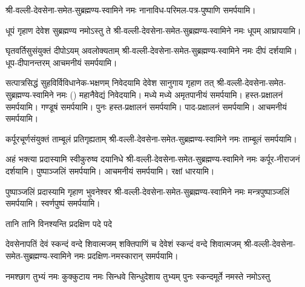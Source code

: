 \begin{center}
\begingroup
\setlength{\columnseprule}{1pt}
\let\chapt\sect



\endgroup

श्री-वल्ली-देवसेना-समेत-सुब्रह्मण्य-स्वामिने नमः नानाविध-परिमल-पत्र-पुष्पाणि समर्पयामि।


{धूपं गृहाण देवेश सुब्रह्मण्य नमोऽस्तु ते}
श्री-वल्ली-देवसेना-समेत-सुब्रह्मण्य-स्वामिने नमः धूपम् आघ्रापयामि।

{घृतवर्तिसुसंयुक्तं दीपोऽयम् अवलोक्यताम्}
श्री-वल्ली-देवसेना-समेत-सुब्रह्मण्य-स्वामिने नमः दीपं दर्शयामि। धूप-दीपानन्तरम् आचमनीयं समर्पयामि।

\twolineshloka
{सत्पात्रसिद्धं सुहविर्विविधानेक-भक्षणम्}
{निवेदयामि देवेश सानुगाय गृहाण तत्}
श्री-वल्ली-देवसेना-समेत-सुब्रह्मण्य-स्वामिने नमः () महानैवेद्यं निवेदयामि। 
मध्ये मध्ये अमृतपानीयं समर्पयामि। हस्त-प्रक्षालनं समर्पयामि। गण्डूषं समर्पयामि। पुनः हस्त-प्रक्षालनं समर्पयामि।
 पाद-प्रक्षालनं समर्पयामि। आचमनीयं समर्पयामि।

{कर्पूरचूर्णसंयुक्तं ताम्बूलं प्रतिगृह्यताम्}
श्री-वल्ली-देवसेना-समेत-सुब्रह्मण्य-स्वामिने नमः ताम्बूलं समर्पयामि।

{अहं भक्त्या प्रदास्यामि स्वीकुरुष्व दयानिधे}
श्री-वल्ली-देवसेना-समेत-सुब्रह्मण्य-स्वामिने नमः कर्पूर-नीराजनं दर्शयामि। 
पुष्पाञ्जलिं समर्पयामि। आचमनीयं समर्पयामि। रक्षां धारयामि।

{पुष्पाञ्जलिं प्रदास्यामि गृहाण भुवनेश्वर}
श्री-वल्ली-देवसेना-समेत-सुब्रह्मण्य-स्वामिने नमः मन्त्रपुष्पाञ्जलिं समर्पयामि। स्वर्णपुष्पं समर्पयामि।

{तानि तानि विनश्यन्ति प्रदक्षिण पदे पदे}

{देवसेनापतिं देवं स्कन्दं वन्दे शिवात्मजम्}
{शक्तिपाणिं च देवेशं स्कन्दं वन्दे शिवात्मजम्}
श्री-वल्ली-देवसेना-समेत-सुब्रह्मण्य-स्वामिने नमः प्रदक्षिण-नमस्कारान् समर्पयामि।

{नमश्छाग तुभ्यं नमः कुक्कुटाय}
{नमः सिन्धवे सिन्धुदेशाय तुभ्यम्}
{पुनः स्कन्दमूर्ते नमस्ते नमोऽस्तु}


\end{center}

